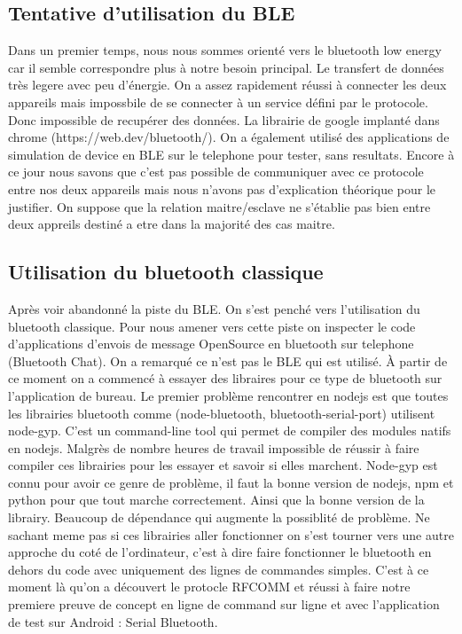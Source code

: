 \documentclass[12pt,fleqn]{article}
\begin{document}
\subsection{Tentative d'utilisation du BLE}
Dans un premier temps, nous nous sommes orienté vers le bluetooth low energy car il semble correspondre plus à notre besoin principal. Le transfert de données très legere avec peu d'énergie. On a assez rapidement réussi à connecter les deux appareils mais impossbile de se connecter à un service défini par le protocole. Donc impossible de recupérer des données. La librairie de google implanté dans chrome (https://web.dev/bluetooth/).
On a également utilisé des applications de simulation de device en BLE sur le telephone pour tester, sans resultats. Encore à ce jour nous savons que c'est pas possible de communiquer avec ce protocole entre nos deux appareils mais nous n'avons pas d'explication théorique pour le justifier. On suppose que la relation maitre/esclave ne s'établie pas bien entre deux appreils destiné a etre dans la majorité des cas maitre. 

\subsection{Utilisation du bluetooth classique}
Après voir abandonné la piste du BLE. On s'est penché vers l'utilisation du bluetooth classique. Pour nous amener vers cette piste on inspecter le code d'applications d'envois de message OpenSource en bluetooth sur telephone (Bluetooth Chat). On a remarqué ce n'est pas le BLE qui est utilisé. À partir de ce moment on a commencé à essayer des libraires pour ce type de bluetooth sur l'application de bureau. Le premier problème rencontrer en nodejs est que toutes les librairies bluetooth comme (node-bluetooth, bluetooth-serial-port) utilisent node-gyp. C'est un command-line tool qui permet de compiler des modules natifs en nodejs. Malgrès de nombre heures de travail impossible de réussir à faire compiler ces librairies pour les essayer et savoir si elles marchent. Node-gyp est connu pour avoir ce genre de problème, il faut la bonne version de nodejs, npm et python pour que tout marche correctement. Ainsi que la bonne version de la librairy. Beaucoup de dépendance qui augmente la possiblité de problème. Ne sachant meme pas si ces librairies aller fonctionner on s'est tourner vers une autre approche du coté de l'ordinateur, c'est à dire faire fonctionner le bluetooth en dehors du code avec uniquement des lignes de commandes simples. C'est à ce moment là qu'on a découvert le protocle RFCOMM et réussi à faire notre premiere preuve de concept en ligne de command sur ligne et avec l'application de test sur Android : Serial Bluetooth.
\end{document}
